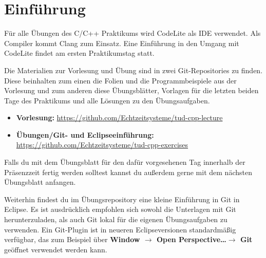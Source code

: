 
\section*{Einführung}
Für alle Übungen des C/C++ Praktikums wird CodeLite als IDE verwendet. Als Compiler kommt Clang zum Einsatz.
Eine Einführung in den Umgang mit CodeLite findet am ersten Praktikumstag statt.

Die Materialien zur Vorlesung und Übung sind in zwei Git-Repositories zu finden.
Diese beinhalten zum einen die Folien und die Programmbeispiele aus der Vorlesung und zum anderen diese Übungsblätter, Vorlagen für die letzten beiden Tage des Praktikums und alle Lösungen zu den Übungsaufgaben.

\begin{itemize}
	\item \textbf{Vorlesung:} \url{https://github.com/Echtzeitsysteme/tud-cpp-lecture}
	\item \textbf{Übungen/Git- und Eclipseeinführung:} \url{https://github.com/Echtzeitsysteme/tud-cpp-exercises}
\end{itemize}

Falls du mit dem Übungsblatt für den dafür vorgesehenen Tag innerhalb der Präsenzzeit fertig werden solltest kannst du außerdem gerne mit dem nächsten Übungsblatt anfangen.

Weiterhin findest du im Übungsrepository eine kleine Einführung in Git in Eclipse.
Es ist ausdrücklich empfohlen sich sowohl die Unterlagen mit Git herunterzuladen, als auch Git lokal für die eigenen Übungsaufgaben zu verwenden.
Ein Git-Plugin ist in neueren Eclipseversionen standardmäßig verfügbar, das zum Beispiel über \textbf{Window $\rightarrow$ Open Perspective\dots $\rightarrow$ Git}  geöffnet verwendet werden kann.



